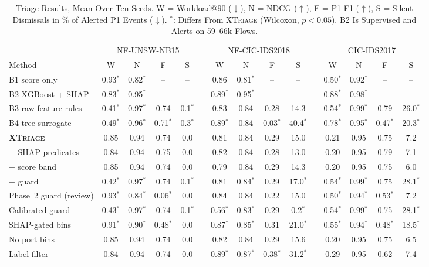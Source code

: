 \documentclass[journal]{IEEEtran}
\begin{document}
\begin{table}[t]
\centering
\caption{Triage Results, Mean Over Ten Seeds. W = Workload@90 ($\downarrow$), N = NDCG ($\uparrow$), F = P1-F1 ($\uparrow$), S = Silent Dismissals in \% of Alerted P1 Events ($\downarrow$). $^{*}$: Differs From \textsc{XTriage} (Wilcoxon, $p<0.05$). B2 Is Supervised and Alerts on 59--66k Flows.}
\label{tab:main}
\setlength{\tabcolsep}{4.5pt}
\scriptsize
\begin{tabular}{@{}l cccc c cccc c cccc@{}}
\toprule
& \multicolumn{4}{c}{NF-UNSW-NB15} && \multicolumn{4}{c}{NF-CIC-IDS2018} && \multicolumn{4}{c}{CIC-IDS2017}\\
\cmidrule{2-5}\cmidrule{7-10}\cmidrule{12-15}
Method & W & N & F & S && W & N & F & S && W & N & F & S\\
\midrule
B1 score only            & 0.93$^{*}$ & 0.82$^{*}$ & -- & -- && 0.86 & 0.81$^{*}$ & -- & -- && 0.50$^{*}$ & 0.92$^{*}$ & -- & --\\
B2 XGBoost + SHAP        & 0.83$^{*}$ & 0.95$^{*}$ & -- & -- && 0.89$^{*}$ & 0.95$^{*}$ & -- & -- && 0.88$^{*}$ & 0.98$^{*}$ & -- & --\\
B3 raw-feature rules     & 0.41$^{*}$ & 0.97$^{*}$ & 0.74 & 0.1$^{*}$ && 0.83 & 0.84 & 0.28 & 14.3 && 0.54$^{*}$ & 0.99$^{*}$ & 0.79 & 26.0$^{*}$\\
B4 tree surrogate        & 0.49$^{*}$ & 0.96$^{*}$ & 0.71$^{*}$ & 0.3$^{*}$ && 0.89$^{*}$ & 0.84 & 0.03$^{*}$ & 40.4$^{*}$ && 0.78$^{*}$ & 0.95$^{*}$ & 0.47$^{*}$ & 20.3$^{*}$\\
\textbf{\textsc{XTriage}} & 0.85 & 0.94 & 0.74 & 0.0 && 0.81 & 0.84 & 0.29 & 15.0 && 0.21 & 0.95 & 0.75 & 7.2\\
\midrule
$-$ SHAP predicates      & 0.84 & 0.94 & 0.75 & 0.0 && 0.82 & 0.84 & 0.28 & 13.0 && 0.20 & 0.95 & 0.79 & 7.1\\
$-$ score band           & 0.85 & 0.94 & 0.74 & 0.0 && 0.79 & 0.84 & 0.29 & 14.3 && 0.20 & 0.95 & 0.75 & 6.0\\
$-$ guard                & 0.42$^{*}$ & 0.97$^{*}$ & 0.74 & 0.1$^{*}$ && 0.81 & 0.84$^{*}$ & 0.29 & 17.0$^{*}$ && 0.54$^{*}$ & 0.99$^{*}$ & 0.75 & 28.1$^{*}$\\
Phase~2 guard (review)   & 0.93$^{*}$ & 0.84$^{*}$ & 0.06$^{*}$ & 0.0 && 0.84 & 0.84 & 0.22 & 15.0 && 0.50$^{*}$ & 0.94$^{*}$ & 0.53$^{*}$ & 7.2\\
\midrule
Calibrated guard         & 0.43$^{*}$ & 0.97$^{*}$ & 0.74 & 0.1$^{*}$ && 0.56$^{*}$ & 0.83$^{*}$ & 0.29 & 0.2$^{*}$ && 0.54$^{*}$ & 0.99$^{*}$ & 0.75 & 28.1$^{*}$\\
SHAP-gated bins          & 0.91$^{*}$ & 0.90$^{*}$ & 0.48$^{*}$ & 0.0 && 0.87$^{*}$ & 0.85$^{*}$ & 0.31 & 21.0$^{*}$ && 0.55$^{*}$ & 0.94$^{*}$ & 0.48$^{*}$ & 18.5$^{*}$\\
No port bins             & 0.85 & 0.94 & 0.74 & 0.0 && 0.82 & 0.84 & 0.29 & 15.6 && 0.20 & 0.95 & 0.75 & 6.5\\
Label filter             & 0.84 & 0.94 & 0.74 & 0.0 && 0.89$^{*}$ & 0.87$^{*}$ & 0.38$^{*}$ & 31.2$^{*}$ && 0.29 & 0.95 & 0.62 & 7.4\\
\bottomrule
\end{tabular}
\end{table}
\end{document}
